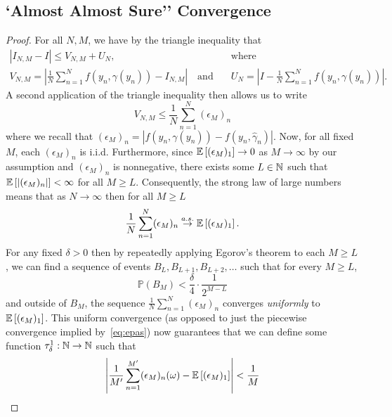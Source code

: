 
\subsection{`Almost Almost Sure'' Convergence}
\label{sec:app:consistent}

\theConsistent*

\begin{proof}
	For all $N, M$, we have by the triangle inequality that
		\begin{align*}
	\left|I_{N,M} - I\right| \leq V_{N,M} + U_N, &\quad \text{where} \\
		V_{N,M} = \left|\frac{1}{N} \sum_{n=1}^N f(y_n, \gamma(y_n)) - I_{N,M} \right| 
		\quad \text{and}& \quad
		U_N = \left|I - \frac{1}{N} \sum_{n=1}^N f(y_n, \gamma(y_n)) \right|.
	\end{align*}
	A second application of the triangle inequality then allows us to write
	\[
    V_{N,M} \leq \frac{1}{N} \sum_{n=1}^N (\epsilon_M)_n
	\]
	where we recall that $(\epsilon_M)_n = |f(y_n, \gamma(y_n)) - f(y_n, \hat{\gamma}_n)|$.
	Now, for all fixed $M$, each $(\epsilon_M)_n$ is i.i.d. Furthermore, since
        $\mathbb{E}
	\left[(\epsilon_M)_1\right] \to 0$ as $M \to \infty$ by our assumption and 
	$(\epsilon_M)_n$ is nonnegative, there exists some $L \in \mathbb{N}$
	such that $\mathbb{E}\left[\left|(\epsilon_M)_n \right|\right] < \infty$ for all $M \geq L$.
	Consequently, the strong law of large numbers means that as $N \to \infty$ then for all $M \geq L$
	\begin{align}
	\label{eq:epas}
	\frac{1}{N} \sum_{n=1}^N (\epsilon_M)_n \overset{a.s.}{\to} \mathbb{E}\left[(\epsilon_M)_1\right].
	\end{align}      
        For any fixed $\delta > 0$ then by repeatedly applying Egorov's theorem to each $M \geq L$,
        we can find a sequence of events $B_{L}, B_{L+1}, B_{L+2}, \ldots$
        such that for every $M \geq L$,
        \[
                \mathbb{P}(B_{M}) < \frac{\delta}{4} \cdot \frac{1}{2^{M-L}}
        \]
        and outside of $B_{M}$, the sequence $\frac{1}{N} \sum_{n=1}^N (\epsilon_M)_n$
        converges \emph{uniformly} to $\mathbb{E}\left[(\epsilon_M)_1\right]$. 
        This uniform convergence (as opposed to just the piecewise convergence implied
        by~\eqref{eq:epas}) now guarantees that we can define some function
        $\tau^1_\delta : \mathbb{N} \to \mathbb{N}$ such that 
	\begin{align}
	\label{eq:ombo}
                \left|\frac{1}{M'} \sum_{n=1}^{M'} (\epsilon_M)_n(\omega) - \E\left[(\epsilon_M)_1\right]\right| < \frac{1}{M} 

\end{align}
\end{proof}
